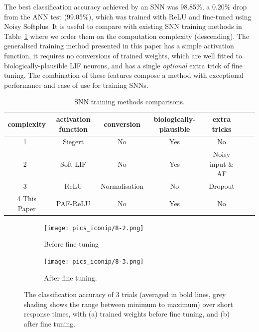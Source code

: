 \documentclass{article}
\begin{document}
The best classification accuracy achieved by an SNN was 98.85\%, a 0.20\% drop from the ANN test (99.05\%), which was trained with ReLU and fine-tuned using Noisy Softplus.
It is useful to compare with existing SNN training methods in Table~\ref{tbl:compare} where we order them on the computation complexity (descending).   
The generalised training method presented in this paper has a simple activation function, it requires no conversions of trained weights, which are well fitted to biologically-plausible LIF neurons, and has a single \emph{optional} extra trick of fine tuning. The combination of these features compose a method with exceptional performance and ease of use for training SNNs.


\begin{table}[thb]
	\centering
	\caption{\label{tbl:compare}SNN training methods comparisons.}
	\bgroup
	\def\arraystretch{1.4}
	\begin{tabular}{c c c c c c c}
		complexity & activation function & conversion & biologically-plausible  & extra tricks \\
		\hline
	 	1~\cite{Jug_etal_2012} & Siegert & No & Yes & No \\
	 	2~\cite{hunsberger2015spiking} & Soft LIF & No & Yes & Noisy input \& AF\\
	 	3~\cite{diehl2015fast} & ReLU & Normalisation & No & Dropout \\
	 	4 This Paper & PAF-ReLU & No & Yes & No 
	\end{tabular}
	\egroup
\end{table}


\begin{figure}[htb!]
	\centering
	\begin{subfigure}[t]{0.49\textwidth}
		\texttt{[image: pics\_iconip/8-2.png]}
		\caption{Before fine tuning}
	\end{subfigure}
	\begin{subfigure}[t]{0.49\textwidth}
		\texttt{[image: pics\_iconip/8-3.png]}
		\caption{After fine tuning.}
	\end{subfigure}
	
	\caption{The classification accuracy of 3 trials (averaged in bold lines, grey shading shows the range between minimum to maximum) over short response times, with (a) trained weights before fine tuning, and (b) after fine tuning.}
	\label{fig:ca_time}	
\end{figure}
\end{document}
